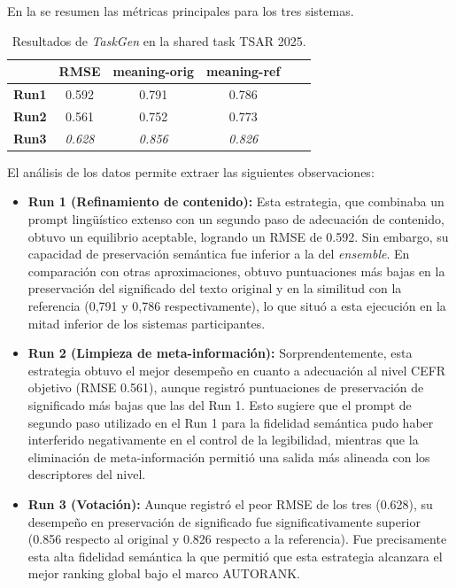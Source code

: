 En la  se resumen las métricas principales para los tres sistemas.


\begin{table}[H]
    \centering \small
    {\renewcommand{\arraystretch}{1.2}
    \begin{tabular}{l|ccccc}
     & {\bf RMSE} & {\bf meaning-orig} & {\bf meaning-ref} \\\hline%
    {\bf Run1} & 0.592 & 0.791 & 0.786 \\%
    {\bf Run2}& 0.561 & 0.752 & 0.773 \\%
    {\bf Run3} & {\it 0.628} &  {\it 0.856} & {\it 0.826} \\%
    \end{tabular}}
    \caption{Resultados de {\it TaskGen} en la shared task TSAR 2025.}
    \label{tab:results_metrics_tsar}
\end{table}

El análisis de los datos permite extraer las siguientes observaciones:

\begin{itemize}
    \item \textbf{Run 1 (Refinamiento de contenido):} Esta estrategia, que combinaba un prompt lingüístico extenso con un segundo paso de adecuación de contenido, obtuvo un equilibrio aceptable, logrando un RMSE de 0.592. Sin embargo, su capacidad de preservación semántica fue inferior a la del \textit{ensemble}. En comparación con otras aproximaciones, obtuvo puntuaciones más bajas en la preservación del significado del texto original y en la similitud con la referencia (0,791 y 0,786 respectivamente), lo que situó a esta ejecución en la mitad inferior de los sistemas participantes.
    
    \item \textbf{Run 2 (Limpieza de meta-información):} Sorprendentemente, esta estrategia obtuvo el mejor desempeño en cuanto a adecuación al nivel CEFR objetivo (RMSE 0.561), aunque registró puntuaciones de preservación de significado más bajas que las del Run 1. Esto sugiere que el prompt de segundo paso utilizado en el Run 1 para la fidelidad semántica pudo haber interferido negativamente en el control de la legibilidad, mientras que la eliminación de meta-información permitió una salida más alineada con los descriptores del nivel.
    
    \item \textbf{Run 3 (Votación):} Aunque registró el peor RMSE de los tres (0.628), su desempeño en preservación de significado fue significativamente superior (0.856 respecto al original y 0.826 respecto a la referencia). Fue precisamente esta alta fidelidad semántica la que permitió que esta estrategia alcanzara el mejor ranking global bajo el marco AUTORANK.
\end{itemize}


